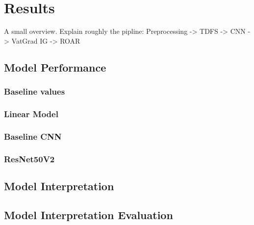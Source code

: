 \chapter{Results}
\label{ch:results}

A small overview. Explain roughly the pipline: Preprocessing -> TDFS -> CNN -> VatGrad IG -> ROAR

\section{Model Performance}
\label{sec:model_performance}

\subsection{Baseline values}
\label{sec:results:bl_values}

\subsection{Linear Model}
\label{sec:results:lm}

\subsection{Baseline CNN}
\label{sec:results:bl_cnn}

\subsection{ResNet50V2}
\label{sec:results:RN50V2}

\section{Model Interpretation}
\label{sec:results:model_interpretation}

\section{Model Interpretation Evaluation}
\label{sec:results:model_inter_eval}

